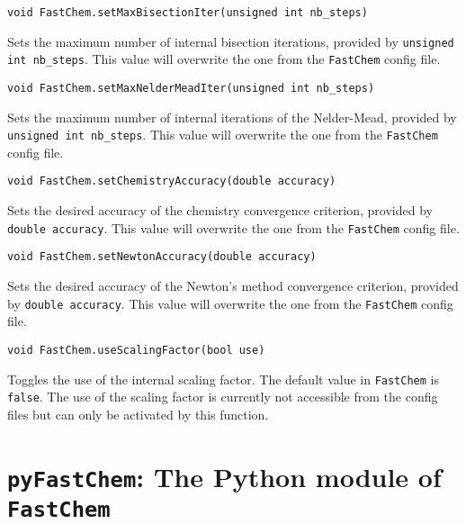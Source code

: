 \documentclass[numbers=noenddot]{aux/fcmanual}
\newcommand{\fc}{\texttt{FastChem}\xspace}
\newcommand{\pfc}{\texttt{pyFastChem}\xspace}
\begin{document}
\bigbreak

\lstinline!void FastChem.setMaxBisectionIter(unsigned int nb_steps)!
\begin{addmargin}[25pt]{0pt}
  Sets the maximum number of internal bisection iterations, provided by \lstinline!unsigned int nb_steps!. This value will overwrite the one from the \fc config file.
\end{addmargin}

\bigbreak

\lstinline!void FastChem.setMaxNelderMeadIter(unsigned int nb_steps)!
\begin{addmargin}[25pt]{0pt}
  Sets the maximum number of internal iterations of the Nelder-Mead, provided by \lstinline!unsigned int nb_steps!. This value will overwrite the one from the \fc config file.
\end{addmargin}

\bigbreak

\lstinline!void FastChem.setChemistryAccuracy(double accuracy)!
\begin{addmargin}[25pt]{0pt}
  Sets the desired accuracy of the chemistry convergence criterion, provided by \lstinline!double accuracy!. This value will overwrite the one from the \fc config file.
\end{addmargin}

\bigbreak

\lstinline!void FastChem.setNewtonAccuracy(double accuracy)!
\begin{addmargin}[25pt]{0pt}
  Sets the desired accuracy of the Newton's method convergence criterion, provided by \lstinline!double accuracy!. This value will overwrite the one from the \fc config file.
\end{addmargin}

\bigbreak

\lstinline!void FastChem.useScalingFactor(bool use)!
\begin{addmargin}[25pt]{0pt}
  Toggles the use of the internal scaling factor. The default value in \fc is \lstinline!false!. The use of the scaling factor is currently not accessible from the config files but can only be activated by this function.
\end{addmargin}



\chapter{\pfc: The Python module of \fc}
\label{sec:pyfc_details}
\end{document}
